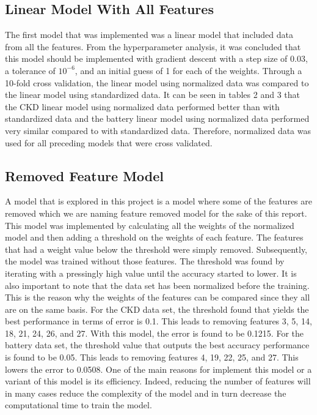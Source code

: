 \documentclass{article}
\begin{document}
\subsection{Linear Model With All Features}

The first model that was implemented was a linear model that included data from all the features.  From the hyperparameter analysis, it was concluded that this model should be implemented with gradient descent with a step size of 0.03, a tolerance of $10^{-6}$, and an initial guess of 1 for each of the weights.  Through a 10-fold cross validation, the linear model using normalized data was compared to the linear model using standardized data.  It can be seen in tables 2 and 3 that the CKD linear model using normalized data performed better than with standardized data and the battery linear model using normalized data performed very similar compared to with standardized data.  Therefore, normalized data was used for all preceding models that were cross validated. 


\subsection{Removed Feature Model}
A model that is explored in this project is a model where some of the features are removed which we are naming feature removed model for the sake of this report. This model was implemented by calculating all the weights of the normalized model and then adding a threshold on the weights of each feature. The features that had a weight value below the threshold were simply removed.  Subsequently, the model was trained without those features. The threshold was found by iterating with a pressingly high value until the accuracy started to lower. It is also important to note that the data set has been normalized before the training. This is the reason why the weights of the features can be compared since they all are on the same basis. For the CKD data set, the threshold found that yields the best performance in terms of error is 0.1. This leads to removing features 3, 5, 14, 18, 21, 24, 26, and 27. With this model, the error is found to be 0.1215. For the battery data set, the threshold value that outputs the best accuracy performance is found to be 0.05.  This leads to removing features 4, 19, 22, 25, and 27. This lowers the error to 0.0508. One of the main reasons for implement this model or a variant of this model is its efficiency. Indeed, reducing the number of features will in many cases reduce the complexity of the model and in turn decrease the computational time to train the model. 
\end{document}
